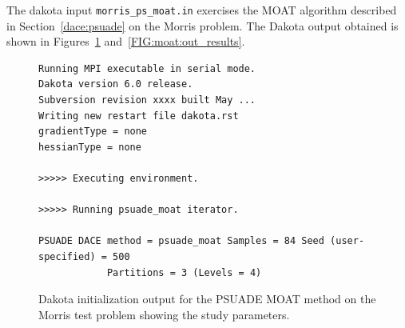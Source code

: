 The dakota input {\tt morris\_ps\_moat.in} exercises
the MOAT algorithm described in Section~\ref{dace:psuade} on the
Morris problem. The Dakota output obtained is shown in
Figures~\ref{FIG:moat:out_preamble} and~\ref{FIG:moat:out_results}.
\begin{figure}[ht!]
\centering
\begin{bigbox}
\begin{small}
\begin{verbatim}
Running MPI executable in serial mode.
Dakota version 6.0 release.
Subversion revision xxxx built May ...
Writing new restart file dakota.rst
gradientType = none
hessianType = none

>>>>> Executing environment.

>>>>> Running psuade_moat iterator.

PSUADE DACE method = psuade_moat Samples = 84 Seed (user-specified) = 500
            Partitions = 3 (Levels = 4)
\end{verbatim}
\end{small}
\end{bigbox}
\caption[Dakota initialization output for PSUADE
MOAT.]{\label{FIG:moat:out_preamble} Dakota initialization output for
the PSUADE MOAT method on the Morris test problem showing the study
parameters.}
\end{figure}
